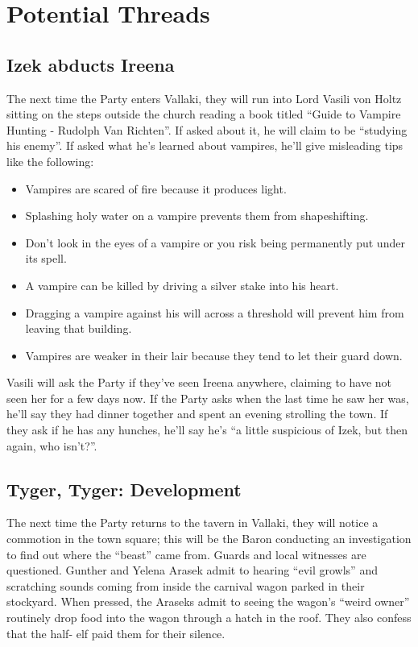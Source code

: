 \documentclass[a4paper,11pt]{article}
\begin{document}
\section{Potential Threads}
\label{sec:PotentialThreads}

\subsection{Izek abducts Ireena}
The next time the Party enters Vallaki, they will run into Lord Vasili von Holtz sitting on the steps outside the church reading a book titled ``Guide to Vampire Hunting - Rudolph Van Richten''. If asked about it, he will claim to be ``studying his enemy''. If asked what he's learned about vampires, he'll give misleading tips like the following:
\begin{itemize}
  \item Vampires are scared of fire because it produces light.
  \item Splashing holy water on a vampire prevents them from shapeshifting.
  \item Don't look in the eyes of a vampire or you risk being permanently put under its spell.
  \item A vampire can be killed by driving a silver stake into his heart.
  \item Dragging a vampire against his will across a threshold will prevent him from leaving that building.
  \item Vampires are weaker in their lair because they tend to let their guard down.
\end{itemize}
Vasili will ask the Party if they've seen Ireena anywhere, claiming to have not seen her for a few days now. If 
the Party asks when the last time he saw her was, he'll say they had dinner together and spent an evening 
strolling the town. If they ask if he has any hunches, he'll say he's ``a little suspicious of Izek, but then 
again, who isn't?''.

\subsection{Tyger, Tyger: Development}
The next time the Party returns to the tavern in Vallaki, they will notice a commotion in the town square; this 
will be the Baron conducting an investigation to find out where the ``beast'' came from. Guards and local 
witnesses are questioned. Gunther and Yelena Arasek admit to hearing ``evil growls'' and scratching sounds coming 
from inside the carnival wagon parked in their stockyard. When pressed, the Araseks admit to seeing the wagon's 
``weird owner'' routinely drop food into the wagon through a hatch in the roof. They also confess that the half-
elf paid them for their silence.
\end{document}
